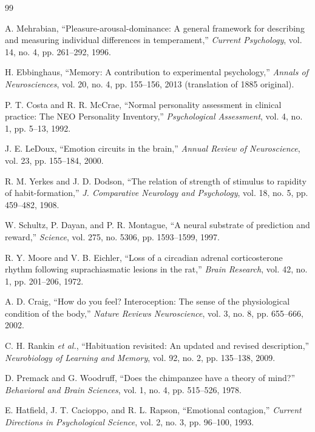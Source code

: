 \documentclass[journal,twoside]{IEEEtran}
\begin{document}
\begin{thebibliography}{99}

A. Mehrabian, ``Pleasure-arousal-dominance: A general framework for describing and measuring individual differences in temperament,'' \textit{Current Psychology}, vol. 14, no. 4, pp. 261--292, 1996.

H. Ebbinghaus, ``Memory: A contribution to experimental psychology,'' \textit{Annals of Neurosciences}, vol. 20, no. 4, pp. 155--156, 2013 (translation of 1885 original).

P. T. Costa and R. R. McCrae, ``Normal personality assessment in clinical practice: The NEO Personality Inventory,'' \textit{Psychological Assessment}, vol. 4, no. 1, pp. 5--13, 1992.

J. E. LeDoux, ``Emotion circuits in the brain,'' \textit{Annual Review of Neuroscience}, vol. 23, pp. 155--184, 2000.

R. M. Yerkes and J. D. Dodson, ``The relation of strength of stimulus to rapidity of habit-formation,'' \textit{J. Comparative Neurology and Psychology}, vol. 18, no. 5, pp. 459--482, 1908.

W. Schultz, P. Dayan, and P. R. Montague, ``A neural substrate of prediction and reward,'' \textit{Science}, vol. 275, no. 5306, pp. 1593--1599, 1997.

R. Y. Moore and V. B. Eichler, ``Loss of a circadian adrenal corticosterone rhythm following suprachiasmatic lesions in the rat,'' \textit{Brain Research}, vol. 42, no. 1, pp. 201--206, 1972.

A. D. Craig, ``How do you feel? Interoception: The sense of the physiological condition of the body,'' \textit{Nature Reviews Neuroscience}, vol. 3, no. 8, pp. 655--666, 2002.

C. H. Rankin \textit{et al.}, ``Habituation revisited: An updated and revised description,'' \textit{Neurobiology of Learning and Memory}, vol. 92, no. 2, pp. 135--138, 2009.

D. Premack and G. Woodruff, ``Does the chimpanzee have a theory of mind?'' \textit{Behavioral and Brain Sciences}, vol. 1, no. 4, pp. 515--526, 1978.

E. Hatfield, J. T. Cacioppo, and R. L. Rapson, ``Emotional contagion,'' \textit{Current Directions in Psychological Science}, vol. 2, no. 3, pp. 96--100, 1993.


\end{thebibliography}
\end{document}
